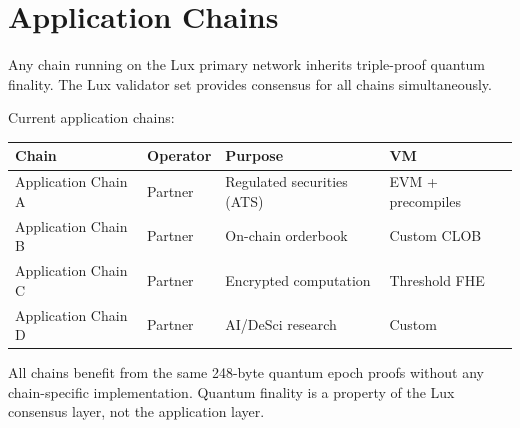 \section{Application Chains}


Any chain running on the Lux primary network inherits triple-proof quantum finality. The Lux validator set provides consensus for all chains simultaneously.

Current application chains:

\begin{center}
\begin{tabular}{llll}
\toprule
\textbf{Chain} & \textbf{Operator} & \textbf{Purpose} & \textbf{VM} \\
\midrule
Application Chain A & Partner & Regulated securities (ATS) & EVM + precompiles \\
Application Chain B & Partner & On-chain orderbook & Custom CLOB \\
Application Chain C & Partner & Encrypted computation & Threshold FHE \\
Application Chain D & Partner & AI/DeSci research & Custom \\
\bottomrule
\end{tabular}
\end{center}

All chains benefit from the same 248-byte quantum epoch proofs without any chain-specific implementation. Quantum finality is a property of the Lux consensus layer, not the application layer.

